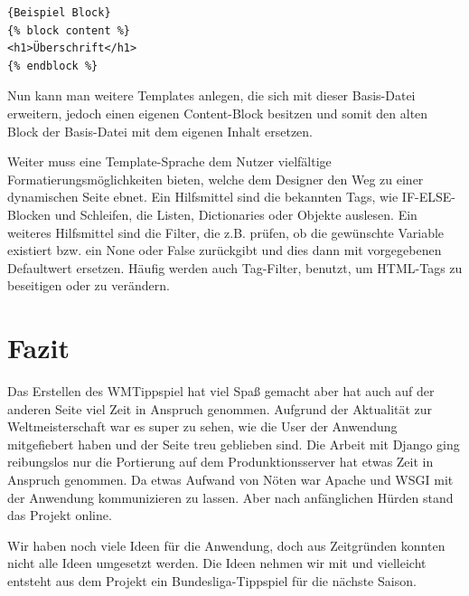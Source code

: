 \begin{lstlisting}[caption=Beispiel]{Beispiel Block}
{% block content %}
<h1>Überschrift</h1>
{% endblock %}
\end{lstlisting}
 
Nun kann man weitere Templates anlegen, die sich mit dieser Basis-Datei 
erweitern, jedoch einen eigenen Content-Block besitzen und somit den alten
Block  der Basis-Datei mit dem eigenen Inhalt ersetzen.

Weiter muss eine Template-Sprache dem Nutzer vielfältige 
Formatierungsmöglichkeiten bieten, welche dem Designer den Weg zu einer 
dynamischen Seite ebnet. Ein Hilfsmittel sind die bekannten Tags, wie 
IF-ELSE-Blocken und Schleifen, die Listen, Dictionaries oder Objekte auslesen. 
Ein weiteres Hilfsmittel sind die Filter, die z.B. prüfen, ob die gewünschte 
Variable existiert bzw. ein None oder False zurückgibt und dies dann mit 
vorgegebenen Defaultwert ersetzen. Häufig werden auch Tag-Filter, benutzt, um 
HTML-Tags zu beseitigen oder zu verändern.


\chapter{Fazit}
Das Erstellen des WMTippspiel hat viel Spaß gemacht aber hat auch auf der
anderen Seite viel Zeit in Anspruch genommen. Aufgrund der Aktualität zur
Weltmeisterschaft war es super zu sehen, wie die User der Anwendung
mitgefiebert haben und der Seite treu geblieben sind. Die Arbeit mit Django ging
reibungslos nur die Portierung auf dem Produnktionsserver hat etwas Zeit in 
Anspruch genommen. Da etwas Aufwand von Nöten war Apache und WSGI mit der 
Anwendung kommunizieren zu lassen. Aber nach anfänglichen Hürden stand das 
Projekt online.

Wir haben noch viele Ideen für die Anwendung, doch aus Zeitgründen konnten
nicht alle Ideen umgesetzt werden. Die Ideen nehmen wir mit und vielleicht
entsteht aus dem Projekt ein Bundesliga-Tippspiel für die nächste Saison. 

